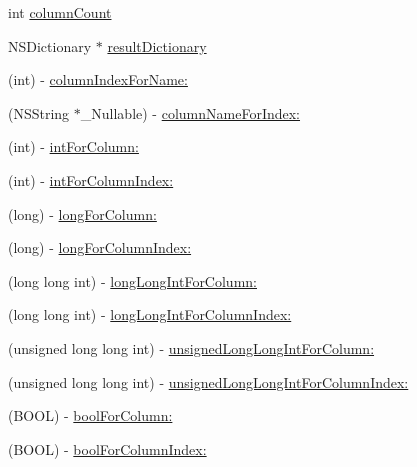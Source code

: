  

 \begin{DoxyCompactItemize}
\item 
int \mbox{\hyperlink{interface_o_p_t_l_y_f_m_d_b_result_set_a82ad3b97a57b4a6e0967e3babd794ffb}{column\+Count}}
\item 
N\+S\+Dictionary $\ast$ \mbox{\hyperlink{interface_o_p_t_l_y_f_m_d_b_result_set_ace597b275ab7cc2b3f351aec058ac048}{result\+Dictionary}}
\item 
(int) -\/ \mbox{\hyperlink{interface_o_p_t_l_y_f_m_d_b_result_set_a5c0e3b88a4b01e1a0975e348eeabac0e}{column\+Index\+For\+Name\+:}}
\item 
(N\+S\+String $\ast$\+\_\+\+Nullable) -\/ \mbox{\hyperlink{interface_o_p_t_l_y_f_m_d_b_result_set_ac153e81c5ea4d8ba8a09ccd60c8841b5}{column\+Name\+For\+Index\+:}}
\item 
(int) -\/ \mbox{\hyperlink{interface_o_p_t_l_y_f_m_d_b_result_set_ae668c33cb56f14743d1daddca94ea3d1}{int\+For\+Column\+:}}
\item 
(int) -\/ \mbox{\hyperlink{interface_o_p_t_l_y_f_m_d_b_result_set_a891494b15f1c7e1951275501891669f7}{int\+For\+Column\+Index\+:}}
\item 
(long) -\/ \mbox{\hyperlink{interface_o_p_t_l_y_f_m_d_b_result_set_a2bf75874eac8d72b119174865ab365f5}{long\+For\+Column\+:}}
\item 
(long) -\/ \mbox{\hyperlink{interface_o_p_t_l_y_f_m_d_b_result_set_a7d32a06b46ea37f2ef83ceaf93364c84}{long\+For\+Column\+Index\+:}}
\item 
(long long int) -\/ \mbox{\hyperlink{interface_o_p_t_l_y_f_m_d_b_result_set_a7035cde8cd8ec3d38f40686e9f86b234}{long\+Long\+Int\+For\+Column\+:}}
\item 
(long long int) -\/ \mbox{\hyperlink{interface_o_p_t_l_y_f_m_d_b_result_set_ace4f1c69bc1d2c014bba100a44fdc4e9}{long\+Long\+Int\+For\+Column\+Index\+:}}
\item 
(unsigned long long int) -\/ \mbox{\hyperlink{interface_o_p_t_l_y_f_m_d_b_result_set_a690f0dcd5f0e4314128f04b1441a5713}{unsigned\+Long\+Long\+Int\+For\+Column\+:}}
\item 
(unsigned long long int) -\/ \mbox{\hyperlink{interface_o_p_t_l_y_f_m_d_b_result_set_ad3f626894ab5132ee0c41383951ce62d}{unsigned\+Long\+Long\+Int\+For\+Column\+Index\+:}}
\item 
(B\+O\+OL) -\/ \mbox{\hyperlink{interface_o_p_t_l_y_f_m_d_b_result_set_acc9546fd178b809056eb3fd592c359b9}{bool\+For\+Column\+:}}
\item 
(B\+O\+OL) -\/ \mbox{\hyperlink{interface_o_p_t_l_y_f_m_d_b_result_set_a3621b2d8e197c699958d4f2d21eb764e}{bool\+For\+Column\+Index\+:}}

\end{DoxyCompactItemize}
